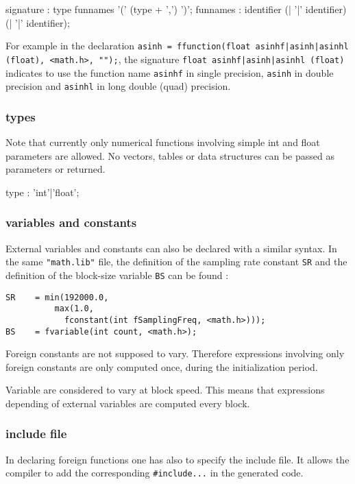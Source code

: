\begin{rail}
signature : type funnames '(' (type + ',') ')';
funnames : identifier (| '|' identifier) (| '|' identifier);
\end{rail}

For example in the declaration \lstinline'asinh = ffunction(float asinhf|asinh|asinhl (float), <math.h>, "");', the signature  \lstinline'float asinhf|asinh|asinhl (float)' indicates to use the function name \lstinline'asinhf' in single precision, \lstinline'asinh' in double precision and \lstinline'asinhl' in long double (quad) precision.


\subsubsection{types}
Note that currently only numerical functions involving simple int and float parameters are allowed. No vectors, tables or data structures can be passed as parameters or returned.

\begin{rail}
type : 'int'|'float';
\end{rail}

\subsubsection{variables and constants} 
External variables and constants can also be declared with a similar syntax. In the same \lstinline'"math.lib"' file, the definition of the sampling rate constant \lstinline'SR' and the definition of the block-size variable \lstinline'BS' can be found :

\begin{lstlisting}
SR    = min(192000.0, 
	      max(1.0, 
	    	fconstant(int fSamplingFreq, <math.h>)));
BS    = fvariable(int count, <math.h>);
\end{lstlisting}

Foreign constants are not supposed to vary. Therefore expressions involving only foreign constants are only computed once, during the initialization period. 

Variable are considered to vary at block speed. This means that expressions depending of external variables are computed every block.

\subsubsection{include file}
In declaring foreign functions one has also to specify the include file. It allows the \faust compiler to add the corresponding \lstinline'#include...' in the generated code.

